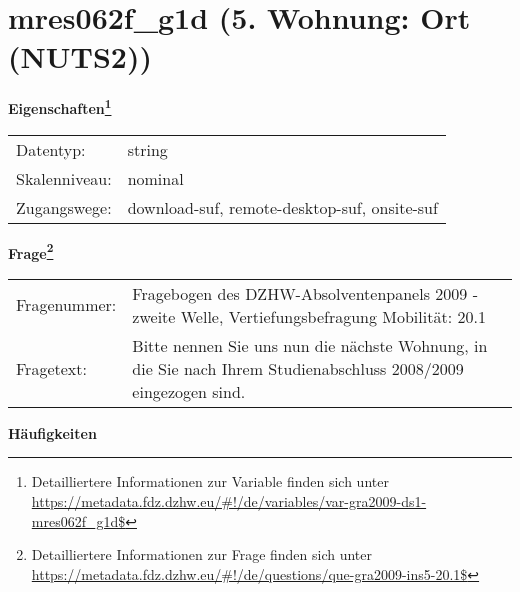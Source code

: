 
    \setcounter{footnote}{0}

    \vspace*{-1.8cm}
	\section{mres062f\_g1d (5. Wohnung: Ort (NUTS2))}
	\label{section:mres062f_g1d}



    \vspace*{0.5cm}
    \noindent\textbf{Eigenschaften\footnote{Detailliertere Informationen zur Variable finden sich unter
		\url{https://metadata.fdz.dzhw.eu/\#!/de/variables/var-gra2009-ds1-mres062f_g1d$}}}\\
	\begin{tabularx}{\hsize}{@{}lX}
	Datentyp: & string \\
	Skalenniveau: & nominal \\
	Zugangswege: &
	  download-suf, 
	  remote-desktop-suf, 
	  onsite-suf
 \\
    \end{tabularx}



				\vspace*{0.5cm}
                \noindent\textbf{Frage\footnote{Detailliertere Informationen zur Frage finden sich unter
		              \url{https://metadata.fdz.dzhw.eu/\#!/de/questions/que-gra2009-ins5-20.1$}}}\\
				\begin{tabularx}{\hsize}{@{}lX}
					Fragenummer: &
					  Fragebogen des DZHW-Absolventenpanels 2009 - zweite Welle, Vertiefungsbefragung Mobilität:
					  20.1
 \\
					Fragetext: & Bitte nennen Sie uns nun die nächste Wohnung, in die Sie nach Ihrem Studienabschluss 2008/2009 eingezogen sind. \\
				\end{tabularx}





        		\vspace*{0.5cm}
                \noindent\textbf{Häufigkeiten}

